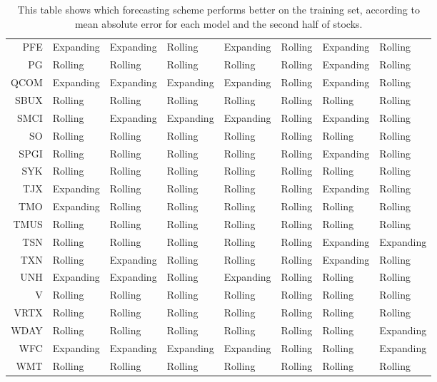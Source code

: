 \begin{table}[ht]
\begin{tabular}{rlllllll}
  PFE & Expanding & Expanding & Rolling & Expanding & Rolling & Expanding & Rolling \\ 
  PG & Rolling & Rolling & Rolling & Rolling & Rolling & Expanding & Rolling \\ 
  QCOM & Expanding & Expanding & Expanding & Expanding & Rolling & Expanding & Rolling \\ 
  SBUX & Rolling & Rolling & Rolling & Rolling & Rolling & Rolling & Rolling \\ 
  SMCI & Rolling & Expanding & Expanding & Expanding & Rolling & Expanding & Rolling \\ 
  SO & Rolling & Rolling & Rolling & Rolling & Rolling & Rolling & Rolling \\ 
  SPGI & Rolling & Rolling & Rolling & Rolling & Rolling & Expanding & Rolling \\ 
  SYK & Rolling & Rolling & Rolling & Rolling & Rolling & Rolling & Rolling \\ 
  TJX & Expanding & Rolling & Rolling & Rolling & Rolling & Expanding & Rolling \\ 
  TMO & Expanding & Rolling & Rolling & Rolling & Rolling & Rolling & Rolling \\ 
  TMUS & Rolling & Rolling & Rolling & Rolling & Rolling & Rolling & Rolling \\ 
  TSN & Rolling & Rolling & Rolling & Rolling & Rolling & Expanding & Expanding \\ 
  TXN & Rolling & Expanding & Rolling & Rolling & Rolling & Expanding & Rolling \\ 
  UNH & Expanding & Expanding & Rolling & Expanding & Rolling & Rolling & Rolling \\ 
  V & Rolling & Rolling & Rolling & Rolling & Rolling & Rolling & Rolling \\ 
  VRTX & Rolling & Rolling & Rolling & Rolling & Rolling & Rolling & Rolling \\ 
  WDAY & Rolling & Rolling & Rolling & Rolling & Rolling & Rolling & Expanding \\ 
  WFC & Expanding & Expanding & Expanding & Expanding & Rolling & Rolling & Expanding \\ 
  WMT & Rolling & Rolling & Rolling & Rolling & Rolling & Rolling & Rolling \\ 
   \hline
\end{tabular}
\caption[Better scheme MAE (2)]{This table shows which forecasting scheme performs better on the training set, according to mean absolute error
              for each model and the second half of stocks.} 
\label{Table:Better_MAE_2}
\end{table}
